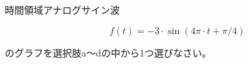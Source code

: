 時間領域アナログサイン波

\[
f(t) = -3 \cdot \sin( 4\pi \cdot t + \pi/4)
\]

\bigskip
\noindent  のグラフを選択肢a〜dの中から1つ選びなさい。
